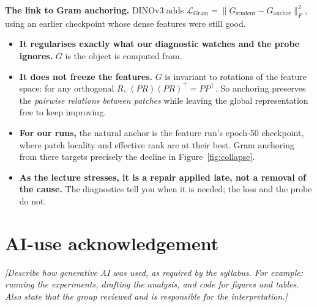 \documentclass[11pt]{article}
\newcommand{\run}[1]{\texttt{\detokenize{#1}}}
\begin{document}
\textbf{The link to Gram anchoring.} DINOv3 adds $\mathcal L_{\text{Gram}}=\|G_{\text{student}}-G_{\text{anchor}}\|_F^2$, using an earlier checkpoint whose dense features were still good.
\begin{itemize}
  \item \textbf{It regularises exactly what our diagnostic watches and the probe ignores.} $G$ is the object \run{patch_locality} is computed from.
  \item \textbf{It does not freeze the features.} $G$ is invariant to rotations of the feature space: for any orthogonal $R$, $(PR)(PR)^\top=PP^\top$. So anchoring preserves the \emph{pairwise relations between patches} while leaving the global representation free to keep improving.
  \item \textbf{For our runs,} the natural anchor is the feature run's epoch-50 checkpoint, where patch locality and effective rank are at their best. Gram anchoring from there targets precisely the decline in Figure~\ref{fig:collapse}.
  \item \textbf{As the lecture stresses, it is a repair applied late, not a removal of the cause.} The diagnostics tell you when it is needed; the loss and the probe do not.
\end{itemize}

\section*{AI-use acknowledgement}
\textit{[Describe how generative AI was used, as required by the syllabus. For example: running the experiments, drafting the analysis, and code for figures and tables. Also state that the group reviewed and is responsible for the interpretation.]}
\end{document}
